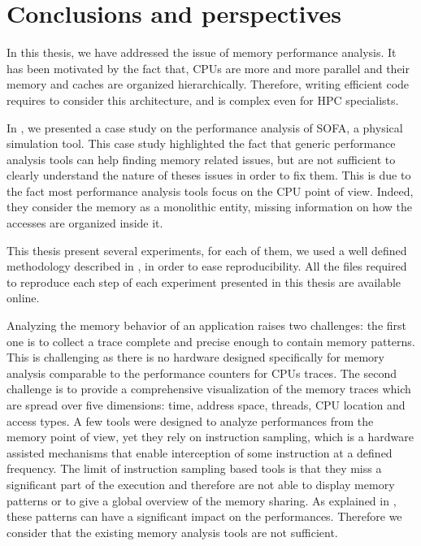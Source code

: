 \chapter{Conclusions and perspectives}
\label{chap:cncl}

In this thesis, we have addressed the issue of memory performance analysis.
It has been motivated by the fact that, \glspl{CPU} are more and more parallel and their memory and caches are organized hierarchically.
Therefore, writing efficient code requires to consider this architecture, and is complex even for \gls{HPC} specialists.

In , we presented a case study on the performance analysis of \gls{SOFA}, a physical simulation tool.
This case study highlighted the fact that generic performance analysis tools can help finding memory related issues, but are not sufficient to clearly understand the nature of theses issues in order to fix them.
This is due to the fact most performance analysis tools focus on the \gls{CPU} point of view.
Indeed, they consider the memory as a monolithic entity, missing information on how the accesses are organized inside it.

This thesis present several experiments, for each of them, we used a well defined methodology described in , in order to ease reproducibility.
All the files required to reproduce each step of each experiment presented in this thesis are available online.

Analyzing the memory behavior of an application raises two challenges: the first one is to collect a trace complete and precise enough to contain memory patterns.
This is challenging as there is no hardware designed specifically for memory analysis comparable to the performance counters for \glspl{CPU} traces.
The second challenge is to provide a comprehensive visualization of the memory traces which are spread over five dimensions: time, address space, threads, \gls{CPU} location and access types.
A few tools were designed to analyze performances from the memory point of view, yet they rely on instruction sampling, which is a hardware assisted mechanisms that enable interception of some instruction at a defined frequency.
The limit of instruction sampling based tools is that they miss a significant part of the execution and therefore are not able to display memory patterns or to give a global overview of the memory sharing.
As explained in , these patterns can have a significant impact on the performances.
Therefore we consider that the existing memory analysis tools are not sufficient.

